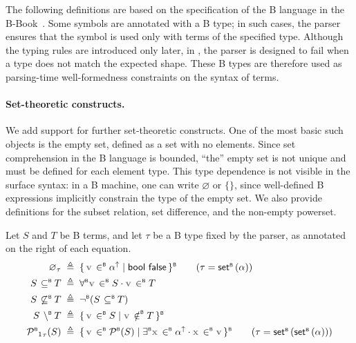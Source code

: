 The following definitions are based on the specification of the B language in the
B-Book~\cite{abrial1996bbook}.
Some symbols are annotated with a B type; in such cases, the parser ensures
that the symbol is used only with terms of the specified type.
Although the typing rules are introduced only later, in ,
the parser is designed to fail when a type does not match the expected shape.
These B types are therefore used as parsing-time well-formedness constraints on
the syntax of terms.

\paragraph{Set-theoretic constructs.}
We add support for further set-theoretic constructs.
One of the most basic such objects is the empty set, defined as a set with no
elements.
Since set comprehension in the B language is bounded, ``the'' empty set is not
unique and must be defined for each element type.
This type dependence is not visible in the surface syntax: in a B machine, one
can write \(\varnothing\) or \(\{\}\), since well-defined B expressions
implicitly constrain the type of the empty set.
We also provide definitions for the subset relation, set difference, and the
non-empty powerset.

\begin{definition}
  \label{def:extra-parsed-syntax}
  Let \(S\) and \(T\) be B terms, and let \(\tau\) be a B type fixed by the parser, as
  annotated on the right of each equation.
  \begin{align*}
    \varnothing_{\tau}  & \;\triangleq\; \bcomp{\var{v} \inB \lift{\alpha}}{\mathsf{bool}\ \mathsf{false}} \tag{\(\tau = \setB(\alpha)\)}            \\
    S \regnotation{\subseteqB} T      & \;\triangleq\; \forallB \var{v} \inB S \cdot \var{v} \inB T                                           \\
    S \regnotation{\notsubseteqB} T   & \;\triangleq\; \notB(S \subseteqB T)                                                      \\
    S \regnotation{\ssubB} T          & \;\triangleq\; \bcomp{\var{v} \inB S}{\var{v} \notinB T}                                          \\
    {\powB_1}_{\tau}(S) & \;\triangleq\; \bcomp{\var{v} \inB \powB(S)}{\existsB \var{x} \inB \lift{\alpha} \cdot \var{x} \inB \var{v}} \tag{\(\tau = \setB(\setB(\alpha))\)}
  \end{align*}
\end{definition}

